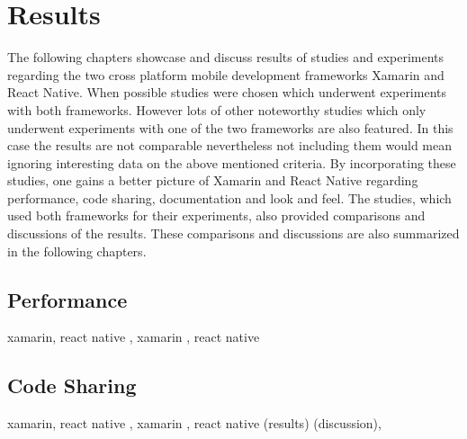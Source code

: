 \documentclass[Bachelor,BIF,english]{twbook}
\begin{document}
\section{Results}
The following chapters showcase and discuss results of studies and experiments regarding the two cross platform mobile development frameworks Xamarin and React Native. When possible studies were chosen which underwent experiments with both frameworks. However lots of other noteworthy studies which only underwent experiments with one of the two frameworks are also featured. In this case the results are not comparable nevertheless not including them would mean ignoring interesting data on the above mentioned criteria. By incorporating these studies, one gains a better picture of Xamarin and React Native regarding performance, code sharing, documentation and look and feel. The studies, which used both frameworks for their experiments, also provided comparisons and discussions of the results. These comparisons and discussions are also summarized in the following chapters.

\subsection{Performance}
xamarin, react native \cite[p.~30-32]{ZubaBernhard2017EdPb}, xamarin \cite{Armgren_2015} \cite{WillocxVossaertNaessens2015}, react native \cite[p.~67-68]{Axelsson2016} \cite[p.~34-43]{Hansson_Vidhall_2016}
\subsection{Code Sharing}
xamarin, react native \cite[p.~71-72]{ZubaBernhard2017EdPb}, xamarin \cite[p.~185]{MartinezLecomte2017}, react native (results\cite[p.~44]{Hansson_Vidhall_2016}) (discussion\cite[p.~53]{Hansson_Vidhall_2016}),
\end{document}
